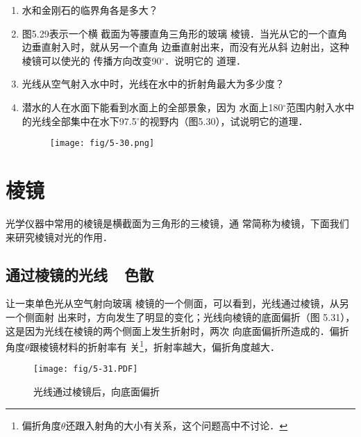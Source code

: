 \begin{enumerate}
    \item 水和金刚石的临界角各是多大？
    \item 图5.29表示一个横
截面为等腰直角三角形的玻璃
棱镜．当光从它的一个直角边垂直射入时，就从另一个直角
边垂直射出来，而没有光从斜
边射出，这种棱镜可以使光的
传播方向改变90$^\circ$．说明它的
道理．
\begin{figure}[htp]
	\centering
{}
	\caption{}
\end{figure}

\item 光线从空气射入水中时，光线在水中的折射角最大为多少度？
\item 潜水的人在水面下能看到水面上的全部景象，因为
水面上180$^\circ$范围内射入水中的光线全部集中在水下97.5$^\circ$的视野内（图5.30），试说明它的道理．
\begin{figure}[htp]\centering
    \texttt{[image: fig/5-30.png]}
    \caption{}
    \end{figure}
\end{enumerate}

\section{棱镜}

光学仪器中常用的棱镜是横截面为三角形的三棱镜，通
常简称为棱镜，下面我们来研究棱镜对光的作用．

\subsection{通过棱镜的光线~~色散}

让一束单色光从空气射向玻璃
棱镜的一个侧面，可以看到，光线通过棱镜，从另一个侧面射
出来时，方向发生了明显的变化；光线向棱镜的底面偏折（图
5.31），这是因为光线在棱镜的两个侧面上发生折射时，两次
向底面偏折所造成的．偏折角度$\theta$跟棱镜材料的折射率有
关\footnote{偏折角度$\theta$还跟入射角的大小有关系，这个问题高中不讨论．}，折射率越大，偏折角度越大．
\begin{figure}[htp]\centering
    \texttt{[image: fig/5-31.PDF]}
    \caption{光线通过棱镜后，向底面偏折}
    \end{figure}

